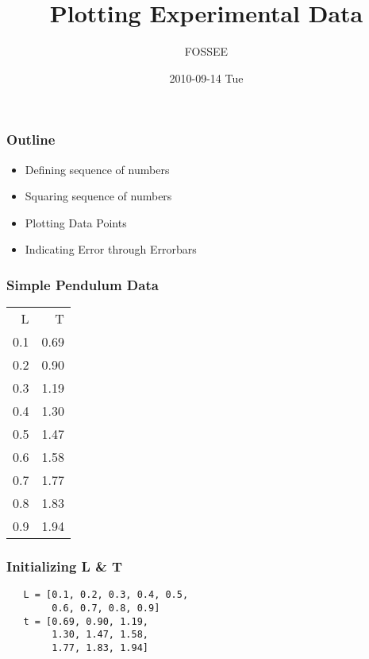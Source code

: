 \documentclass[presentation]{beamer}
\title{Plotting Experimental Data}
\author{FOSSEE}
\date{2010-09-14 Tue}
\begin{document}
\maketitle









\begin{frame}
\frametitle{Outline}
\label{sec-1}

\begin{itemize}
\item Defining sequence of numbers
\item Squaring sequence of numbers
\item Plotting Data Points
\item Indicating Error through Errorbars
\end{itemize}
\end{frame}
\begin{frame}
\frametitle{Simple Pendulum Data}
\label{sec-2}




\begin{center}
\begin{tabular}{rr}
   L  &     T  \\
 0.1  &  0.69  \\
 0.2  &  0.90  \\
 0.3  &  1.19  \\
 0.4  &  1.30  \\
 0.5  &  1.47  \\
 0.6  &  1.58  \\
 0.7  &  1.77  \\
 0.8  &  1.83  \\
 0.9  &  1.94  \\
\end{tabular}
\end{center}


  
\end{frame}
\begin{frame}[fragile]
\frametitle{Initializing L \& T}
\label{sec-3}

\begin{verbatim}
   L = [0.1, 0.2, 0.3, 0.4, 0.5,
        0.6, 0.7, 0.8, 0.9]
   t = [0.69, 0.90, 1.19,
        1.30, 1.47, 1.58,
        1.77, 1.83, 1.94]
\end{verbatim}
\end{frame}
\end{document}
